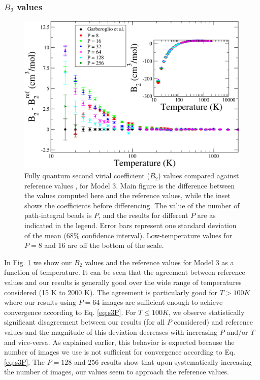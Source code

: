             \subsubsection{$B_2$ values}
                \begin{figure}[!htbp]
                    \centering
                    \includegraphics[scale=0.20,keepaspectratio]{Chapter-4/Figures/s3GarberoglioAll.png}
                    \caption{Fully quantum second virial coefficient ($B_2$) values compared against reference values \cite{Garberoglio2014}, for Model 3. Main figure is the difference between the values computed here and the reference values, while the inset shows the coefficients before differencing. The value of the number of path-integral beads is $P$, and the results for different $P$ are as indicated in the legend. Error bars represent one standard deviation of the mean (68\% confidence interval). Low-temperature values for $P = 8$ and 16 are off the bottom of the scale.}
                    \label{fig:variable}
                \end{figure}

                In Fig. \ref{fig:variable} we show our $B_2$ values and the reference values for Model 3 as a function of temperature. It can be seen that the agreement between reference values and our results is generally good over the wide range of temperatures considered (15 K to 2000 K). The agreement is particularly good for $T > 100 K$ where our results using $P = 64$ images are sufficient enough to achieve convergence according to Eq. \eqref{eq:s3P}. For $T \le 100 K$, we observe statistically significant disagreement between our results (for all $P$ considered) and reference values and the magnitude of this deviation decreases with increasing $P$ and/or $T$ and vice-versa. As explained earlier, this behavior is expected because the number of images we use is not sufficient for convergence according to Eq. \eqref{eq:s3P}. The $P = 128$ and $256$ results show that upon systematically increasing the number of images, our values seem to approach the reference values.

